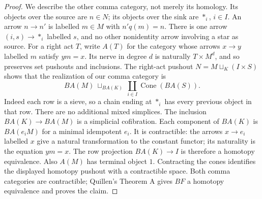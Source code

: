 \begin{proof}
We describe the other comma category, not merely its
homology. Its objects over the source are $n\in N$;
its objects over the sink are $*_i$, $i\in I$.
An arrow $n\to n'$ is labelled $m\in M$ with
$n'q(m)=n$. There is one arrow $(i,s)\to *_i$
labelled $s$, and no other nonidentity arrow involving
a star as source. For a right act $T$, write $A(T)$
for the category whose arrows $x\to y$ labelled $m$
satisfy $ym=x$. Its nerve in degree $d$ is naturally
$T\times M^d$, and so preserves set pushouts and
inclusions. The right-act pushout
$N=M\sqcup_K(I\times S)$ shows that the realization
of our comma category is
\[
 BA(M)\ \sqcup_{BA(K)}\
       \coprod_{i\in I}\operatorname{Cone}(BA(S)).
\]
Indeed each row is a sieve, so a chain ending at $*_i$
has every previous object in that row. There are no
additional mixed simplices. The inclusion $BA(K)\to
BA(M)$ is a simplicial cofibration. Each component
of $BA(K)$ is $BA(e_iM)$ for a minimal idempotent $e_i$.
It is contractible: the arrows $x\to e_i$ labelled
$x$ give a natural transformation to the constant
functor; its naturality is the equation $ym=x$.
The row projection $BA(K)\to I$ is therefore a
homotopy equivalence. Also $A(M)$ has terminal object
$1$. Contracting the cones identifies the displayed
homotopy pushout with a contractible space. Both comma
categories are contractible; Quillen's Theorem A gives
$BF$ a homotopy equivalence and proves the claim.
\end{proof}

